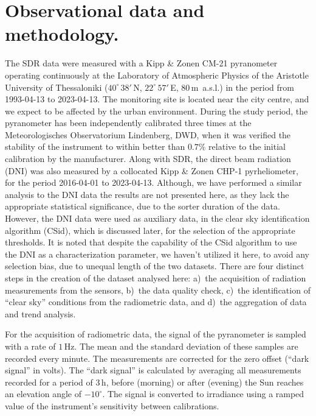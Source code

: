 \documentclass[An awesome
journal,,,moreauthors,pdftex]{Definitions/mdpi}
\begin{document}
\hypertarget{observational-data-and-methodology.}{%
\section{Observational data and
methodology.}\label{observational-data-and-methodology.}}

The SDR data were measured with a Kipp \& Zonen CM-21 pyranometer
operating continuously at the Laboratory of Atmospheric Physics of the
Aristotle University of Thessaloniki (\(40^\circ\,38'\,\)N,
\(22^\circ\,57'\,\)E, \(80\,\)m~a.s.l.) in the period from 1993-04-13 to
2023-04-13. The monitoring site is located near the city centre, and we
expect to be affected by the urban environment. During the study period,
the pyranometer has been independently calibrated three times at the
Meteorologisches Observatorium Lindenberg, DWD, when it was verified the
stability of the instrument to within better than \(0.7\%\) relative to
the initial calibration by the manufacturer. Along with SDR, the direct
beam radiation (DNI) was also measured by a collocated Kipp \& Zonen
CHP-1 pyrheliometer, for the period 2016-04-01 to 2023-04-13. Although,
we have performed a similar analysis to the DNI data the results are not
presented here, as they lack the appropriate statistical significance,
due to the sorter duration of the data. However, the DNI data were used
as auxiliary data, in the clear sky identification algorithm (CSid),
which is discussed later, for the selection of the appropriate
thresholds. It is noted that despite the capability of the CSid
algorithm to use the DNI as a characterization parameter, we haven't
utilized it here, to avoid any selection bias, due to unequal length of
the two datasets. There are four distinct steps in the creation of the
dataset analysed here: a)~the acquisition of radiation measurements from
the sensors, b)~the data quality check, c)~the identification of ``clear
sky'' conditions from the radiometric data, and d)~the aggregation of
data and trend analysis.

For the acquisition of radiometric data, the signal of the pyranometer
is sampled with a rate of \(1\,\text{Hz}\). The mean and the standard
deviation of these samples are recorded every minute. The measurements
are corrected for the zero offset (``dark signal'' in volts). The ``dark
signal'' is calculated by averaging all measurements recorded for a
period of \(3\,\text{h}\), before (morning) or after (evening) the Sun
reaches an elevation angle of \(-10^\circ\). The signal is converted to
irradiance using a ramped value of the instrument's sensitivity between
calibrations.
\end{document}
